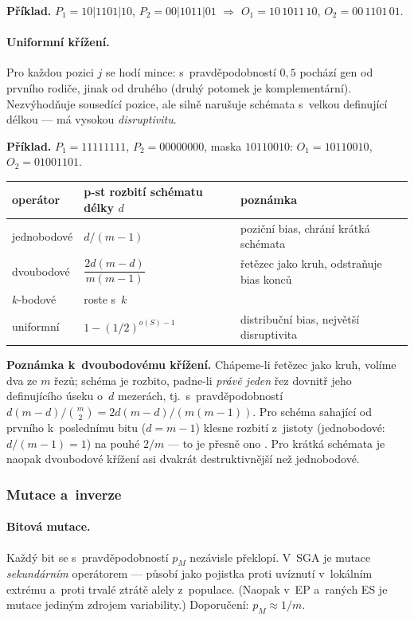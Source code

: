 \documentclass[11pt,a4paper]{article}
\theoremstyle{definition}
\begin{document}
\textbf{Příklad.} $P_1 = 10|1101|10$, $P_2 = 00|1011|01$ $\Rightarrow$
$O_1 = 10\,1011\,10$, $O_2 = 00\,1101\,01$.

\paragraph{Uniformní křížení.} Pro každou pozici $j$ se hodí mince: s~pravděpodobností
$0{,}5$ pochází gen od prvního rodiče, jinak od druhého (druhý potomek je
komplementární). Nezvýhodňuje sousedící pozice, ale silně narušuje schémata
s~velkou definující délkou --- má vysokou \emph{disruptivitu}.

\textbf{Příklad.} $P_1 = 11111111$, $P_2 = 00000000$, maska $10110010$:
$O_1 = 10110010$, $O_2 = 01001101$.

\begin{center}
\begin{tabular}{@{}lll@{}}
\toprule
\textbf{operátor} & \textbf{p-st rozbití schématu délky $d$} & \textbf{poznámka} \\
\midrule
jednobodové & $d/(m-1)$ & poziční bias, chrání krátká schémata \\
dvoubodové & $\dfrac{2d(m-d)}{m(m-1)}$ & řetězec jako kruh, odstraňuje bias konců \\
$k$-bodové & roste s~$k$ & \\
uniformní & $1 - (1/2)^{o(S)-1}$ & distribuční bias, největší disruptivita \\
\bottomrule
\end{tabular}
\end{center}

\textbf{Poznámka k~dvoubodovému křížení.} Chápeme-li řetězec jako kruh, volíme
dva ze $m$ řezů; schéma je rozbito, padne-li \emph{právě jeden} řez dovnitř
jeho definujícího úseku o~$d$ mezerách, tj.\ s~pravděpodobností
$d(m-d)/\binom{m}{2} = 2d(m-d)/(m(m-1))$. Pro schéma sahající od prvního
k~poslednímu bitu ($d = m-1$) klesne rozbití z~jistoty (jednobodové:
$d/(m-1) = 1$) na pouhé $2/m$ --- to je přesně ono . Pro krátká schémata je naopak dvoubodové křížení asi dvakrát
destruktivnější než jednobodové.

\subsubsection{Mutace a~inverze}

\paragraph{Bitová mutace.} Každý bit se s~pravděpodobností $p_M$ nezávisle
překlopí. V~SGA je mutace \emph{sekundárním} operátorem --- působí jako pojistka
proti uvíznutí v~lokálním extrému a~proti trvalé ztrátě alely
z~populace. (Naopak v~EP a~raných ES je mutace jediným zdrojem variability.)
Doporučení: $p_M \approx 1/m$.
\end{document}
